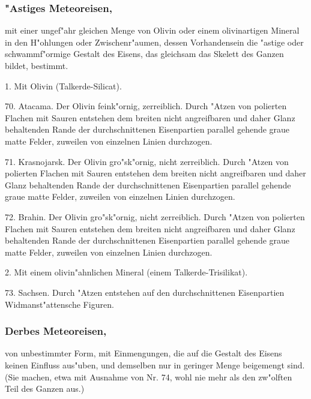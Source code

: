 \documentclass[a4paper, 11pt, oneside, polutonikogreek, german]{article}
\begin{document}
\subsubsection["Astiges Meteoreisen.]{"Astiges Meteoreisen,}
mit einer ungef"ahr gleichen Menge von Olivin oder einem olivinartigen Mineral in den H"ohlungen oder Zwischenr"aumen, dessen Vorhandensein die "astige oder schwammf"ormige Gestalt des Eisens, das gleichsam das Skelett des Ganzen bildet, bestimmt.

\vspace{2ex}

1. Mit Olivin (Talkerde-Silicat).

\vspace{2ex}

70. Atacama. Der Olivin feink"ornig, zerreiblich. Durch "Atzen von polierten Flachen mit Sauren entstehen dem breiten nicht angreifbaren und daher Glanz behaltenden Rande der durchschnittenen Eisenpartien parallel gehende graue matte Felder, zuweilen von einzelnen Linien durchzogen.

71. Krasnojarsk. Der Olivin gro"sk"ornig, nicht zerreiblich. Durch "Atzen von polierten Flachen mit Sauren entstehen dem breiten nicht angreifbaren und daher Glanz behaltenden Rande der durchschnittenen Eisenpartien parallel gehende graue matte Felder, zuweilen von einzelnen Linien durchzogen.

72. Brahin. Der Olivin gro"sk"ornig, nicht zerreiblich. Durch "Atzen von polierten Flachen mit Sauren entstehen dem breiten nicht angreifbaren und daher Glanz behaltenden Rande der durchschnittenen Eisenpartien parallel gehende graue matte Felder, zuweilen von einzelnen Linien durchzogen.

\vspace{2ex}

2. Mit einem olivin"ahnlichen Mineral (einem Talkerde-Trisilikat).

\vspace{2ex}

73. Sachsen. Durch "Atzen entstehen auf den durchschnittenen Eisenpartien Widmanst"attensche Figuren.

\subsubsection[Derbes Meteoreisen.]{Derbes Meteoreisen,}
von unbestimmter Form, mit Einmengungen, die auf die Gestalt des Eisens keinen Einfluss aus"uben, und demselben nur in geringer Menge beigemengt sind. (Sie machen, etwa mit Ausnahme von Nr. 74, wohl nie mehr als den zw"olften Teil des Ganzen aus.)
\end{document}
